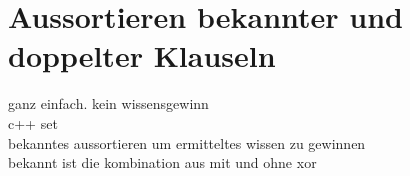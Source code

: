 \section{Aussortieren bekannter und doppelter Klauseln}


ganz einfach. kein wissensgewinn\\
c++ set\\
bekanntes aussortieren um ermitteltes wissen zu gewinnen\\
bekannt ist die kombination aus mit und ohne xor
